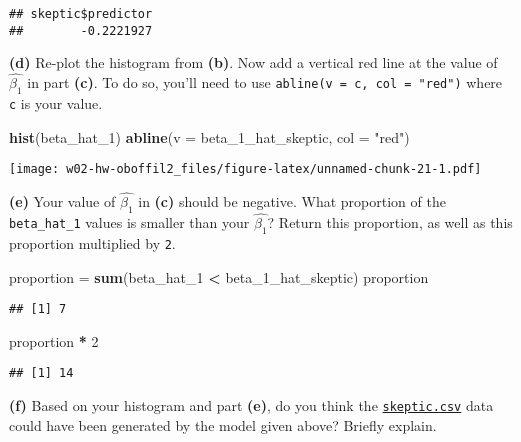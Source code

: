 \documentclass[]{article}
\newenvironment{Shaded}{\begin{snugshade}}{\end{snugshade}}
\newcommand{\DataTypeTok}[1]{\textcolor[rgb]{0.13,0.29,0.53}{#1}}
\newcommand{\DecValTok}[1]{\textcolor[rgb]{0.00,0.00,0.81}{#1}}
\newcommand{\KeywordTok}[1]{\textcolor[rgb]{0.13,0.29,0.53}{\textbf{#1}}}
\newcommand{\NormalTok}[1]{#1}
\newcommand{\OperatorTok}[1]{\textcolor[rgb]{0.81,0.36,0.00}{\textbf{#1}}}
\newcommand{\StringTok}[1]{\textcolor[rgb]{0.31,0.60,0.02}{#1}}
\begin{document}
\begin{verbatim}
## skeptic$predictor 
##        -0.2221927
\end{verbatim}

\textbf{(d)} Re-plot the histogram from \textbf{(b)}. Now add a vertical
red line at the value of \(\hat{\beta_1}\) in part \textbf{(c)}. To do
so, you'll need to use \texttt{abline(v\ =\ c,\ col\ =\ "red")} where
\texttt{c} is your value.

\begin{Shaded}
\begin{Highlighting}[]
\KeywordTok{hist}\NormalTok{(beta_hat_}\DecValTok{1}\NormalTok{)}
\KeywordTok{abline}\NormalTok{(}\DataTypeTok{v =}\NormalTok{ beta_}\DecValTok{1}\NormalTok{_hat_skeptic, }\DataTypeTok{col =} \StringTok{"red"}\NormalTok{)}
\end{Highlighting}
\end{Shaded}

\texttt{[image: w02-hw-oboffil2\_files/figure-latex/unnamed-chunk-21-1.pdf]}

\textbf{(e)} Your value of \(\hat{\beta_1}\) in \textbf{(c)} should be
negative. What proportion of the \texttt{beta\_hat\_1} values is smaller
than your \(\hat{\beta_1}\)? Return this proportion, as well as this
proportion multiplied by \texttt{2}.

\begin{Shaded}
\begin{Highlighting}[]
\NormalTok{proportion =}\StringTok{ }\KeywordTok{sum}\NormalTok{(beta_hat_}\DecValTok{1} \OperatorTok{<}\StringTok{ }\NormalTok{beta_}\DecValTok{1}\NormalTok{_hat_skeptic)}
\NormalTok{proportion}
\end{Highlighting}
\end{Shaded}

\begin{verbatim}
## [1] 7
\end{verbatim}

\begin{Shaded}
\begin{Highlighting}[]
\NormalTok{proportion }\OperatorTok{*}\StringTok{ }\DecValTok{2}
\end{Highlighting}
\end{Shaded}

\begin{verbatim}
## [1] 14
\end{verbatim}

\textbf{(f)} Based on your histogram and part \textbf{(e)}, do you think
the \href{skeptic.csv}{\texttt{skeptic.csv}} data could have been
generated by the model given above? Briefly explain.
\end{document}
